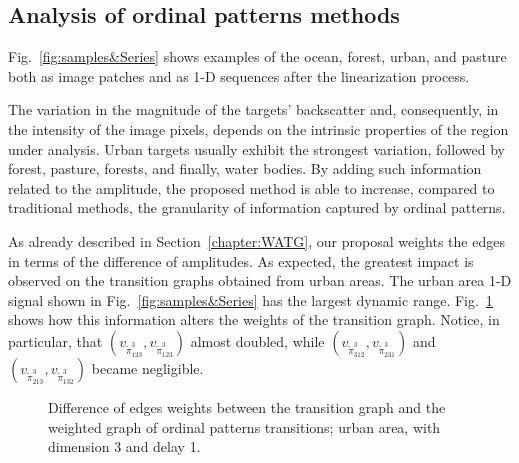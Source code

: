\subsection{Analysis of ordinal patterns methods}

Fig.~\ref{fig:samples&Series} shows examples of the ocean, forest, urban, and pasture both as image patches and as 1-D sequences after the linearization process.

The variation in the magnitude of the targets' backscatter and, consequently, in the intensity of the image pixels, depends on the intrinsic properties of the region under analysis.
Urban targets usually exhibit the strongest variation, followed by forest, pasture, forests, and finally, water bodies.
By adding such information related to the amplitude, the proposed method is able to increase, compared to traditional methods, the granularity of information captured by ordinal patterns.

As already described in Section~\ref{chapter:WATG}, our proposal weights the edges in terms of the difference of amplitudes.
As expected, the greatest impact is observed on the transition graphs obtained from urban areas.
The urban area \mbox{1-D} signal shown in Fig.~\ref{fig:samples&Series} has the largest dynamic range.
Fig.~\ref{fig:graphs} shows how this information alters the weights of the transition graph.
Notice, in particular, that 
$(v_{\widetilde \pi^3_{123}}, v_{\widetilde \pi^3_{123}})$ almost doubled, while 
$(v_{\widetilde \pi^3_{312}}, v_{\widetilde \pi^3_{231}})$ and $(v_{\widetilde \pi^3_{213}}, v_{\widetilde \pi^3_{132}})$ became negligible.

\begin{figure}
	\centering
	\caption{Difference of edges weights between the transition graph and the weighted graph of ordinal patterns transitions; urban area, with dimension 3 and delay 1.}
	\label{fig:graphs}
\end{figure}


